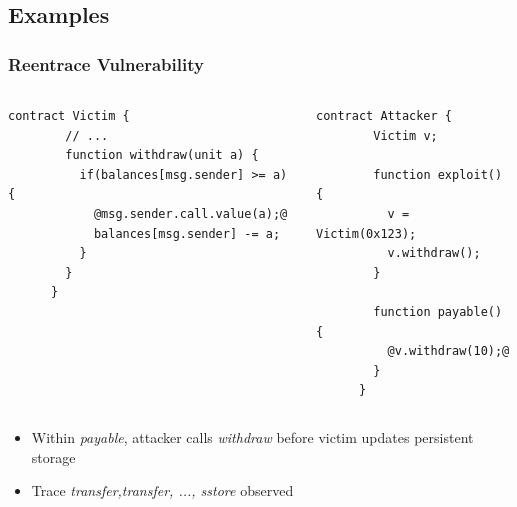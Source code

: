 \documentclass{beamer}
\begin{document}
\subsection{Examples}
\begin{frame}[fragile]
  \frametitle{Reentrace Vulnerability}
  \begin{columns}
    \begin{column}{0.5\textwidth}
      \begin{lstlisting}[numbers = none, language=Solidity, style=transitions]
      contract Victim {
        // ...
        function withdraw(unit a) {
          if(balances[msg.sender] >= a) {
            @msg.sender.call.value(a);@
            balances[msg.sender] -= a;
          }
        }
      }
      \end{lstlisting}
    \end{column}

    \begin{column}{0.5\textwidth}
      \begin{lstlisting}[language=Solidity, style=transitions, numbers=none]
      contract Attacker {
        Victim v;

        function exploit() {
          v = Victim(0x123);
          v.withdraw();
        }

        function payable() {
          @v.withdraw(10);@
        }
      }
      \end{lstlisting}
    \end{column}
  \end{columns}
  \begin{itemize}
    \item<2-> Within \textit{payable}, attacker calls \textit{withdraw}
      before victim updates persistent storage
    \item<2-> Trace \textit{transfer,transfer, ..., sstore} observed
  \end{itemize}

\end{frame}
\end{document}
